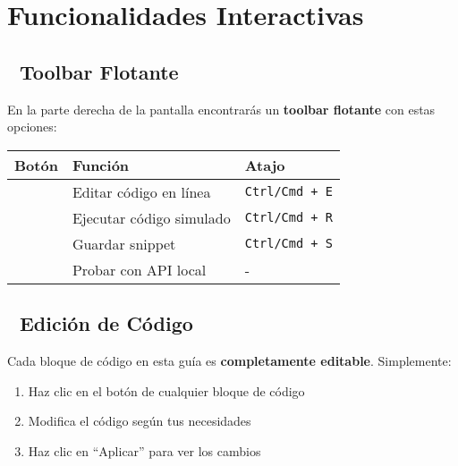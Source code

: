 \documentclass[
  11pt,
  letterpaper,
  oneside,
  openany]{scrbook}
\providecommand{\tightlist}{%
  \setlength{\itemsep}{0pt}\setlength{\parskip}{0pt}}
\begin{document}
\section{Funcionalidades
Interactivas}\label{funcionalidades-interactivas}

\subsection{🎯 Toolbar Flotante}\label{toolbar-flotante}

En la parte derecha de la pantalla encontrarás un \textbf{toolbar
flotante} con estas opciones:

\begin{longtable}[]{@{}
  >{\raggedright\arraybackslash}p{}
  >{\raggedright\arraybackslash}p{}
  >{\raggedright\arraybackslash}p{}@{}}
\toprule\noalign{}
\begin{minipage}[b]{\linewidth}\raggedright
Botón
\end{minipage} & \begin{minipage}[b]{\linewidth}\raggedright
Función
\end{minipage} & \begin{minipage}[b]{\linewidth}\raggedright
Atajo
\end{minipage} \\
\midrule\noalign{}
\endhead
\bottomrule\noalign{}
\endlastfoot
& Editar código en línea & \texttt{Ctrl/Cmd\ +\ E} \\
& Ejecutar código simulado & \texttt{Ctrl/Cmd\ +\ R} \\
& Guardar snippet & \texttt{Ctrl/Cmd\ +\ S} \\
& Probar con API local & - \\
\end{longtable}

\subsection{📝 Edición de Código}\label{ediciuxf3n-de-cuxf3digo}

Cada bloque de código en esta guía es \textbf{completamente editable}.
Simplemente:

\begin{enumerate}
\def\labelenumi{\arabic{enumi}.}
\tightlist
\item
  Haz clic en el botón de cualquier bloque de código
\item
  Modifica el código según tus necesidades
\item
  Haz clic en ``Aplicar'' para ver los cambios
\end{enumerate}
\end{document}
